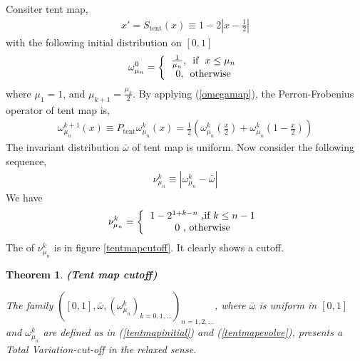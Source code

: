 \documentclass{article}
\newtheorem{theorem}{Theorem}
\begin{document}
Consiter tent map,
   \begin{eqnarray}
   \label{tentmap}
     x' = S_\text{tent}(x) \equiv 1-2|x-\frac{1}{2}|
   \end{eqnarray}
with the following initial distribution on $[0 ,1]$
  \begin{eqnarray}
  \label{tentmapinitial}
    \omega_{\mu_n}^0 = \left\{ \begin{tabular}{c}
                      $\frac{1}{\mu_n}$, \mbox{  if  } $x \le \mu_n$\\ 
                      $0$, \mbox{  otherwise} 
                      \end{tabular}\right.
  \end{eqnarray}
where $\mu_1 = 1$, and $\mu_{k+1} = \frac{\mu_k}{2}$. By applying (\ref{omegamap}), the Perron-Frobenius operator of tent map is,
  \begin{eqnarray}
  \label{tentmapevolve}
    \omega_{\mu_n}^{k+1}(x) \equiv P_\text{tent} \omega_{\mu_n}^{k}(x)
                             = \frac{1}{2}\left( \omega_{\mu_n}^{k}\left(\frac{x}{2}\right)+
                                                 \omega_{\mu_n}^{k}\left(1-\frac{x}{2}\right)  \right)
  \end{eqnarray}
The invariant distribution $\bar{\omega}$ of tent map is uniform. Now consider the following sequence,
 \begin{eqnarray}
  \nu_{\mu_n}^k \equiv  |\omega_{\mu_n}^k-\bar{\omega} | 
 \end{eqnarray}
We have 
 \begin{eqnarray}
   \nu_{\mu_n}^k =  \left\{ \begin{tabular}{c} 
                    $1- 2^{1+k-n} $  ,if $k \le n-1$ \\
                    $0$   , otherwise
                    \end{tabular}\right.
 \end{eqnarray}
The of $\nu_{\mu_n}^k$ is in figure \ref{tentmapcutoff}. It clearly shows a cutoff. 

\begin{theorem} {\bfseries (Tent map cutoff)}

The family $([0,1],\bar{\omega}, (\omega^k_{\mu_n})_{k=0,1,...})_{n=1,2,...}$, where $\bar{\omega}$ is uniform in $[0,1]$ and $\omega^k_{\mu_n}$ are defined as in (\ref{tentmapinitial}) and (\ref{tentmapevolve}), presents a Total Variation-cut-off in the relaxed sense.
\end{theorem}
\end{document}
